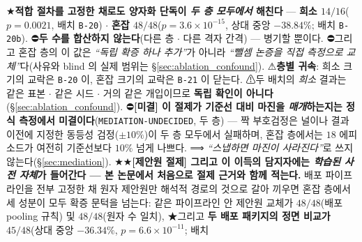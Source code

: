 \documentclass[11pt]{report}
\numberwithin{equation}{chapter}
\numberwithin{figure}{chapter}
\numberwithin{table}{chapter}
\begin{document}
\begin{enumerate}
        ★\textbf{적합 절차를 고정한 채로도 양자화 단독이 \emph{두 층 모두에서} 해친다}
        --- \textbf{희소 $14/16$}($p = 0.0021$, 배치 \texttt{B-20}) $\cdot$
        \textbf{혼잡 $48/48$}($p = 3.6\times10^{-15}$, 상대 중앙 $-38.84\%$;
        배치 \texttt{B-20b}).
        ⛔\textbf{두 수를 합산하지 않는다}(다른 층 $\cdot$ 다른 격자 간격)
        --- 병기할 뿐이다. ⛔그리고 혼잡 층의 이 값은 \emph{``독립 확증 하나 추가''}가
        아니라 \emph{``뺄셈 논증을 직접 측정으로 교체''}다(사유와 blind 의 실제 범위는
        \S\ref{sec:ablation_confound}). ⚠\textbf{층별 귀속}: 희소 크기의 교락은 \texttt{B-20} 이,
        혼잡 크기의 교락은 \texttt{B-21} 이 닫는다. ⚠두 배치의 \emph{희소} 결과는 같은
        표본 $\cdot$ 같은 시드 $\cdot$ 거의 같은 개입이므로 \textbf{독립 확인이 아니다}
        (\S\ref{sec:ablation_confound}).
        ⛔\textbf{[미결] 이 절제가 기준선 대비 마진을 \emph{매개}하는지는 정식 측정에서
        미결이다}(\texttt{MEDIATION-UNDECIDED}, 두 층) --- 짝 부호검정은 널이나 결과
        이전에 지정한 동등성 검정($\pm 10\%$)이 두 층 모두에서 실패하며, 혼잡 층에서는
        $18$ 에피소드가 여전히 기준선보다 $10\%$ 넘게 나쁘다.
        ⟹ \emph{``스냅하면 마진이 사라진다''}로 쓰지 않는다(\S\ref{sec:mediation}).
        ★★\textbf{[제안원 절제] 그리고 이 이득의 담지자에는 \emph{학습된 사전 자체}가
        들어간다 --- 본 논문에서 처음으로 절제 근거와 함께 적는다.} 배포 파이프라인을
        전부 고정한 채 원자 제안원만 해석적 경로의 것으로 갈아 끼우면 혼잡 층에서 세
        성분이 모두 확증 문턱을 넘는다: 같은 파이프라인 안 제안원 교체가 $48/48$(배포
        pooling 규칙) 및 $48/48$(원자 수 일치), ★그리고 \textbf{두 배포 패키지의 정면
        비교가 $45/48$}(상대 중앙 $-36.34\%$, $p = 6.6\times10^{-11}$; 배치

\end{enumerate}
\end{document}
